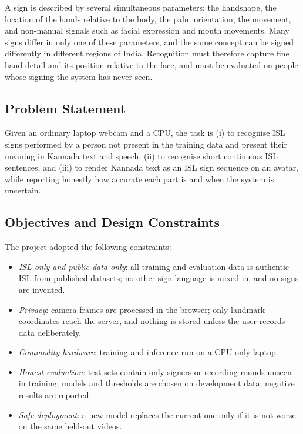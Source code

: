 \documentclass[conference]{IEEEtran}
\begin{document}
A sign is described by several simultaneous parameters: the handshape, the location of the hands relative to the body, the palm orientation, the movement, and non-manual signals such as facial expression and mouth movements. Many signs differ in only one of these parameters, and the same concept can be signed differently in different regions of India. Recognition must therefore capture fine hand detail and its position relative to the face, and must be evaluated on people whose signing the system has never seen.

\subsection{Problem Statement}
Given an ordinary laptop webcam and a CPU, the task is (i) to recognise ISL signs performed by a person not present in the training data and present their meaning in Kannada text and speech, (ii) to recognise short continuous ISL sentences, and (iii) to render Kannada text as an ISL sign sequence on an avatar, while reporting honestly how accurate each part is and when the system is uncertain.

\subsection{Objectives and Design Constraints}
The project adopted the following constraints:
\begin{itemize}
\item \textit{ISL only and public data only}: all training and evaluation data is authentic ISL from published datasets; no other sign language is mixed in, and no signs are invented.
\item \textit{Privacy}: camera frames are processed in the browser; only landmark coordinates reach the server, and nothing is stored unless the user records data deliberately.
\item \textit{Commodity hardware}: training and inference run on a CPU-only laptop.
\item \textit{Honest evaluation}: test sets contain only signers or recording rounds unseen in training; models and thresholds are chosen on development data; negative results are reported.
\item \textit{Safe deployment}: a new model replaces the current one only if it is not worse on the same held-out videos.
\end{itemize}
\end{document}
